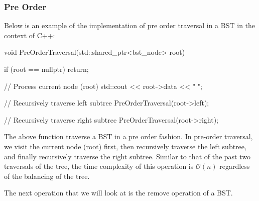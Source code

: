 \begin{highlight}

\subsubsection*{Pre Order}

Below is an example of the implementation of pre order traversal in a BST in the context of C++:

\begin{code}
void PreOrderTraversal(std::shared_ptr<bst_node> root) {
    if (root == nullptr)
        return;

    // Process current node (root)
    std::cout << root->data << " ";

    // Recursively traverse left subtree
    PreOrderTraversal(root->left);

    // Recursively traverse right subtree
    PreOrderTraversal(root->right);
}
\end{code}

\noindent The above function traverse a BST in a pre order fashion. In pre-order traversal, we visit the current node (root) first, then recursively traverse the left subtree, and finally recursively 
traverse the right subtree. Similar to that of the past two traversals of the tree, the time complexity of this operation is $\mathcal{O}(n)$ regardless of the balancing of the tree.

\end{highlight}

The next operation that we will look at is the remove operation of a BST.

